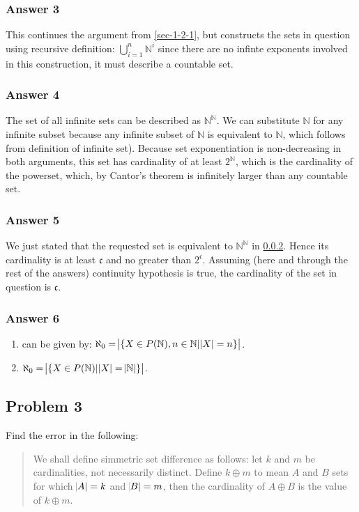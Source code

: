 \documentclass[11pt]{article}
\begin{document}
\subsubsection{Answer 3}
\label{sec-1-2-2}
This continues the argument from \ref{sec-1-2-1}, but constructs the sets in question
using recursive definition: $\bigcup_{i=1}^n \mathbb{N}^i$ since there are
no infinte exponents involved in this construction, it must describe a countable
set.
\subsubsection{Answer 4}
\label{sec-1-2-3}
The set of all infinite sets can be described as $\mathbb{N}^{\mathbb{N}}$.
We can substitute $\mathbb{N}$ for any infinite subset because any infinite
subset of $\mathbb{N}$ is equivalent to $\mathbb{N}$, which follows from
definition of infinite set).  Because set exponentiation is non-decreasing
in both arguments, this set has cardinality of at least $2^{\mathbb{N}}$,
which is the cardinality of the powerset, which, by Cantor's theorem
is infinitely larger than any countable set.
\subsubsection{Answer 5}
\label{sec-1-2-4}
We just stated that the requested set is equivalent to
$\mathbb{N}^{\mathbb{N}}$ in \ref{sec-1-2-3}.  Hence its cardinality is at least
$\mathfrak{c}$ and no greater than $2^\mathfrak{c}$.  Assuming (here and
through the rest of the answers) continuity hypothesis is true, the
cardinality of the set in question is $\mathfrak{c}$.
\subsubsection{Answer 6}
\label{sec-1-2-5}
\begin{enumerate}
\item can be given by: $\aleph_0 = \abs{\{X \in P(\mathbb{N}), n \in 
       \mathbb{N} | \abs{X} = n\}}$.
\item $\aleph_0 = \abs{\{X \in P(\mathbb{N}) | \abs{X} =
       \abs{\mathbb{N}}\}}$.
\end{enumerate}
\subsection{Problem 3}
\label{sec-1-3}
Find the error in the following:

\begin{quote}
We shall define simmetric set difference as follows: let $k$ and $m$ be cardinalities,
not necessarily distinct.  Define $k \oplus m$ to mean $A$ and $B$ sets for which
$\abs{A} = k$ and $\abs{B} = m$, then the cardinality of $A \oplus B$ is the value
of $k \oplus m$.
\end{quote}
\end{document}

